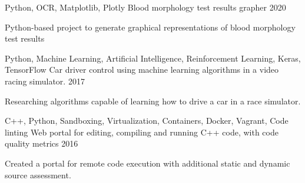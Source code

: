 

\begin{cventries}


  \cventry
    {Python, OCR, Matplotlib, Plotly} %
    {Blood morphology test results grapher} %
    {} %
    {2020} %
    {
      \begin{cvitems} %
        Python-based project to generate graphical representations of blood morphology test results
      \end{cvitems}
    }

  \cventry
    {Python, Machine Learning, Artificial Intelligence, Reinforcement Learning, Keras, TensorFlow} %
    {Car driver control using machine learning algorithms in a video racing simulator.} %
    {} %
    {2017} %
    {
      \begin{cvitems} %
        Researching algorithms capable of learning how to drive a car in a race simulator.
      \end{cvitems}
    }

  \cventry
    {C++, Python, Sandboxing, Virtualization, Containers, Docker, Vagrant, Code linting} %
    {Web portal for editing, compiling and running C++ code, with code quality metrics} %
    {} %
    {2016} %
    {
      \begin{cvitems} %
        Created a portal for remote code execution with additional static and dynamic source assessment.
      \end{cvitems}
    }

\end{cventries}
